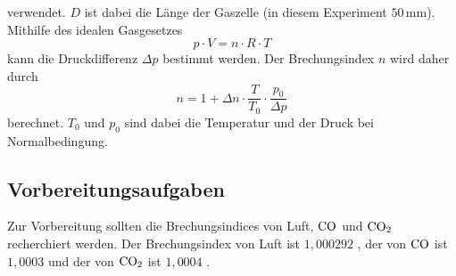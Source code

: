 verwendet. $D$ ist dabei die Länge der Gaszelle (in diesem Experiment $50 \,\unit{\milli\meter}$). Mithilfe des idealen Gasgesetzes 
\begin{equation}
    p \cdot V = n \cdot R \cdot T
    \label{eqn:Ideale_Gasgleichung}
\end{equation}
kann die Druckdifferenz $\Delta p$ bestimmt werden. Der Brechungsindex $n$ wird daher durch 
\begin{equation}
    n = 1 + \Delta n \cdot \frac{T}{T_0} \cdot \frac{p_0}{\Delta p}
    \label{eqn:Brechungsindex}
\end{equation}
berechnet. $T_0$ und $p_0$ sind dabei die Temperatur und der Druck bei Normalbedingung. 
\subsection{Vorbereitungsaufgaben}
\label{sec:Vorbereitungsaufgaben}
Zur Vorbereitung sollten die Brechungsindices von Luft, $\ce{CO}$ und $\ce{CO_2}$ recherchiert werden. Der Brechungsindex von Luft ist $1,000292$ \cite{Luft},
 der von $\ce{CO}$ ist $1,0003$ \cite{CO}
und der von $\ce{CO_2}$ ist $1,0004$ \cite{CO_2}. 

